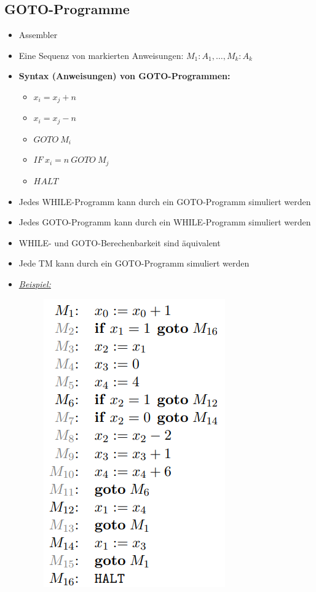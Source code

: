 \documentclass[ieeetran]{article}
\begin{document}
\subsection{GOTO-Programme} %
\label{sub:gOTO_programe}
\begin{itemize}
  \item Assembler
\item Eine Sequenz von markierten Anweisungen: $M_1:A_1, \ldots, M_k:A_k$
\item \textbf{Syntax (Anweisungen) von GOTO-Programmen:}
	\begin{itemize}
		\item $x_i = x_j + n$
	\item $x_i = x_j - n$
	\item $GOTO \ M_i$
	\item $IF \ x_i = n \ GOTO \ M_j$
	\item $HALT$
	\end{itemize}

\item Jedes WHILE-Programm kann durch ein GOTO-Programm simuliert werden
\item Jedes GOTO-Programm kann durch ein WHILE-Programm simuliert werden
\item WHILE- und GOTO-Berechenbarkeit sind äquivalent

\item Jede TM kann durch ein GOTO-Programm simuliert werden

\item \textit{\underline{Beispiel:}}
	\begin{figure}[h!]
	  \centering
	  \includegraphics[width=0.2\linewidth]{gotoexample}
	  \label{fig:gotoexample}
	\end{figure}
\end{itemize}
\end{document}
